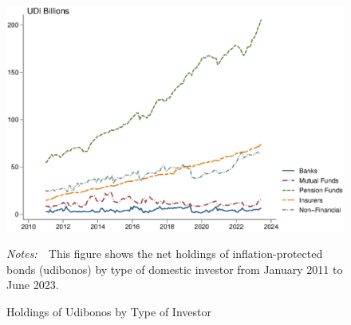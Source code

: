 \documentclass[a4paper, 12pt]{article}
\newcommand{\figtext}[1]{
	\vspace{-1ex}
	\captionsetup{justification=justified,font=footnotesize}
	\caption*{#1}
}
\newcommand{\fignotes}[1]{\figtext{\emph{Notes:~}~#1}}
\providecommand{\lastobsflwbdm}{June 2023}
\begin{document}
\begin{appendices}
	\begin{figure}[!htb]
		\caption{Holdings of Udibonos by Type of Investor} \label{fig:categsudi}
		\begin{center}
			\begin{minipage}{0.9\linewidth}
				\begin{center}
					\includegraphics[width=1\textwidth,height=.3\textheight]{../Figures/categsudi} \\
				\end{center}
				\fignotes{This figure shows the net holdings of inflation-protected bonds (udibonos) by type of domestic investor from January 2011 to \lastobsflwbdm.}
			\end{minipage}
		\end{center}
	\end{figure}
	

\end{appendices}
\end{document}
